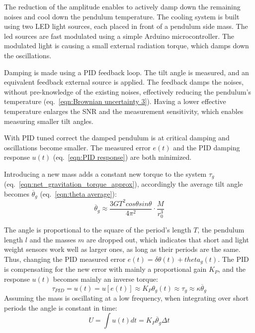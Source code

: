 \documentclass[\main/master.tex]{subfiles}
\begin{document}
\par\noindent
The reduction of the amplitude enables to actively damp down the remaining noises and cool down the pendulum temperature. The cooling system is built using two LED light sources, each placed in front of a pendulum side mass. The led sources are fast modulated using a simple Arduino microcontroller. The modulated light is causing a small external radiation torque, which damps down the oscillations.
\par\noindent
Damping is made using a PID feedback loop. The tilt angle is measured, and an equivalent feedback external source is applied. The feedback damps the noises, without pre-knowledge of the existing noises, effectively reducing the pendulum's temperature (eq.~\ref{eqn:Brownian uncertainty 3}). Having a lower effective temperature enlarges the SNR and the measurement sensitivity, which enables measuring smaller tilt angles.
\par\noindent
With PID tuned correct the damped pendulum is at critical damping and oscillations become smaller. The measured error $e(t)$ and the PID damping response $u(t)$ (eq.~\ref{eqn:PID response}) are both minimized. 
\par\noindent
Introducing a new mass adds a constant new torque to the system $\tau_g$ (eq.~\ref{eqn:net_gravitation_torque_approx}), accordingly the average tilt angle becomes $\overline{\theta}_g$ (eq.~\ref{eqn:theta average}):
\begin{equation}
\overline{\theta}_g  \approx \frac{3GT^2cos\theta sin\theta}{4\pi^2 } \cdot \frac{M}{r_0^3}   \label{eqn:theta average_2}
\end{equation}
\par\noindent
The angle is proportional to the square of the period's length $T$, the pendulum length $l$ and the masses $m$ are dropped out, which indicates that short and light weight sensors work well as larger ones, as long as their periods are the same. Thus, changing the PID measured error $e(t) = \delta\theta(t) + theta_g(t)$. The PID is compensating for the new error with mainly a proportional gain $K_P$, and the response $u(t)$ becomes mainly an inverse torque:
\begin{equation}
\tau_{PID} = u(t) = u[e(t)] \approx K_P\theta_g(t) \approx \tau_{g} \approx \kappa \overline{\theta}_g 
\label{eqn:PID_response}
\end{equation}
Assuming the mass is oscillating at a low frequency, when integrating over short periods the angle is constant in time:
\begin{equation}
U = \int u(t) dt = K_P\overline{\theta}_g\Delta t 
\label{eqn:PID_measurement_eqn}
\end{equation}
\end{document}
